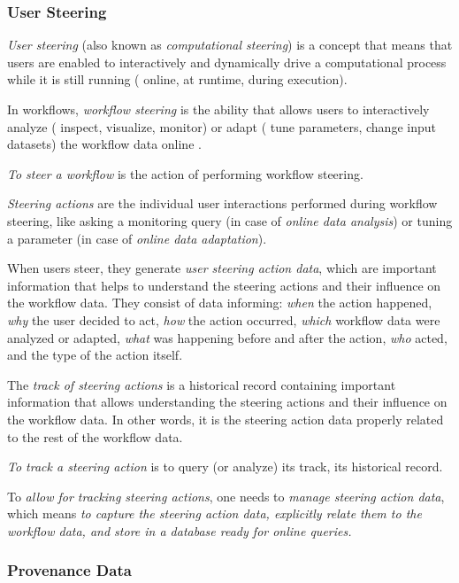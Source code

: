 \subsubsection{User Steering}

\textit{User steering} (also known as \textit{computational steering}) is a concept that means that users are enabled to interactively and dynamically drive a computational process while it is still running (\ie{} online, at runtime, during execution).

In workflows, \textit{workflow steering} is the ability that allows users to interactively analyze (\eg{} inspect, visualize, monitor) or adapt (\eg{} tune parameters, change input datasets) the workflow data online \cite{Mattoso2015Dynamic}.

\textit{To steer a workflow} is the action of performing workflow steering.

\textit{Steering actions}
are the individual user interactions performed during workflow steering, like asking a monitoring query (in case of \textit{online data analysis}) or tuning a parameter (in case of \textit{online data adaptation}).

When users steer, they generate \textit{user steering action data}, which are important information that helps to understand the steering actions and their influence on the workflow data. They consist of data informing: \textit{when} the action happened, \textit{why} the user decided to act, \textit{how} the action occurred, \textit{which} workflow data were analyzed or adapted, \textit{what} was happening before and after the action, \textit{who} acted, and the type of the action itself.

The \textit{track of steering actions} is a historical record containing important information that allows understanding the steering actions and their influence on the workflow data. In other words, it is the steering action data properly related to the rest of the workflow data.

\textit{To track a steering action}
is to query (or analyze) its track, \ie{} its historical record.

To \textit{allow for tracking steering actions}, one needs to \textit{manage steering action data}, which means \textit{to capture the steering action data, explicitly relate them to the workflow data, and store in a database ready for online queries.}


\subsubsection{Provenance Data}

